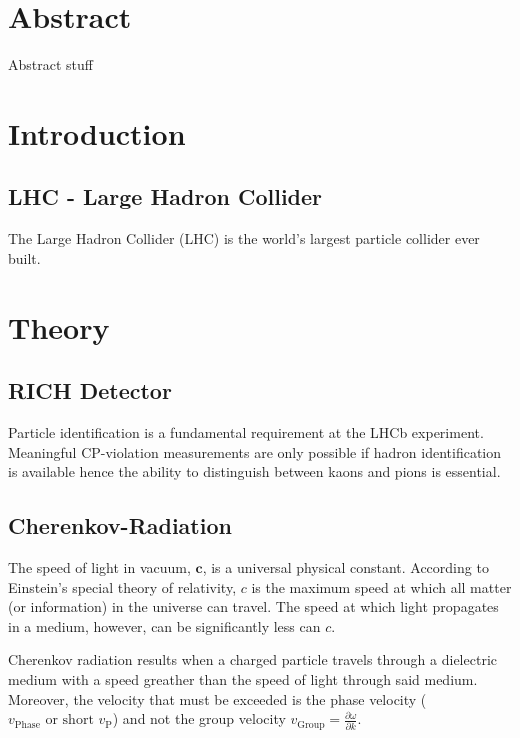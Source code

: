 \documentclass[10pt,twoside]{scrreprt}
\begin{document}
\chapter*{Abstract}
Abstract stuff
	

\chapter{Introduction}
\section{LHC - Large Hadron Collider} %
\label{sec:lhc_large_hadron_collider}

The Large Hadron Collider (LHC) is the world's largest particle collider ever built. 


\chapter{Theory}

\section{RICH Detector} %
\label{sec:rich_detector}

Particle identification is a fundamental requirement at the LHCb experiment. Meaningful CP-violation measurements are only possible if hadron identification is available hence the ability to distinguish between kaons and pions is  essential.

\section{Cherenkov-Radiation} %
\label{sec:cherenkov_radiation}

The speed of light in vacuum, \( \mathbf{c} \), is a universal physical constant. According to Einstein's special theory of relativity, \( c \) is the maximum speed at which all matter (or information) in the universe can travel. The speed at which light propagates in a medium, however, can be significantly less can \( c \).

Cherenkov radiation results when a charged particle travels through a dielectric medium with a speed greather than the speed of light through said medium. Moreover, the velocity that must be exceeded is the phase velocity (\( v_{\text{Phase}} \text{ or short } v_{\text{P}} \)) and not the group velocity \( v_{\text{Group}} = \frac{\partial \omega}{\partial k} \).
\end{document}
